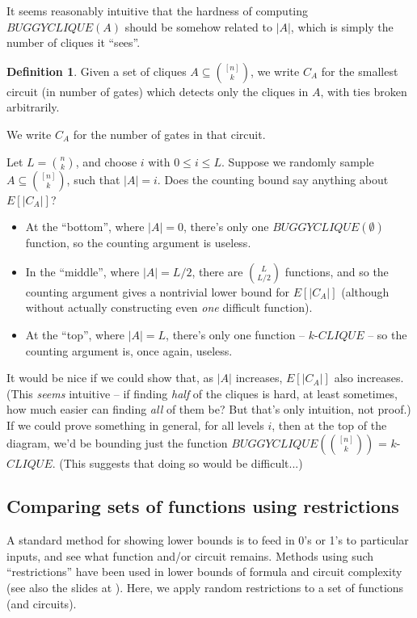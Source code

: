 \documentclass[12pt]{article}
\theoremstyle{definition}
\newtheorem{defn}{Definition}[section]
\begin{document}
It seems reasonably intuitive that the hardness of
computing $BUGGYCLIQUE(A)$ should be somehow related to
$|A|$, which is simply the number of cliques it ``sees''.

\begin{defn}\label{de:circuit}
Given a set of cliques $A \subseteq {[n] \choose k}$,
we write $C_A$ for the smallest circuit (in number of gates)
which detects only the cliques
in $A$, with ties broken arbitrarily.

We write $C_A$ for the number of gates in that circuit.
\end{defn}

Let $L = {n \choose k}$, and choose $i$ with $0 \le i \le L$.
Suppose we randomly sample $A \subseteq {[n] \choose k}$, such that
$|A| = i$.
Does the counting bound
say anything about $E[|C_A|]$?

\begin{itemize}
\item At the ``bottom'', where $|A| = 0$, there's only one $BUGGYCLIQUE(\emptyset)$
function, so the counting argument is useless.

\item In the ``middle'', where $|A| = L/2$,
there are ${L \choose {L/2}}$ functions, and so the counting
argument gives a nontrivial lower bound for
$E[|C_A|]$ (although
without actually constructing even {\em one} difficult function).

\item At the ``top'', where $|A| = L$, there's only one function
-- $k$-$CLIQUE$ --
so the counting argument is, once again, useless.
\end{itemize}

It would be nice if we could show that, as $|A|$ increases,
$E[|C_A|]$ also increases.
(This {\em seems} intuitive -- if finding {\em half} of the cliques
is hard, at least sometimes, how much easier can finding {\em all}
of them be? But that's only intuition, not proof.)
If we could prove something in general, for all levels $i$, then at
the top of the diagram, we'd be bounding just the function
$BUGGYCLIQUE({[n] \choose k})$ = $k$-$CLIQUE$. (This suggests that doing so would
be difficult...)

\subsection{Comparing sets of functions using restrictions}

A standard method for showing lower bounds is to feed in 0's or
1's to particular inputs, and see what function and/or circuit remains.
Methods using such ``restrictions'' have been used in lower bounds of formula
\cite{subbotovskaya1963comparison} and circuit \cite{hastad1987lower}
complexity (see also the slides at \cite{rossmanRestrictions}).
Here, we apply random restrictions to a set of functions (and circuits).
\end{document}
